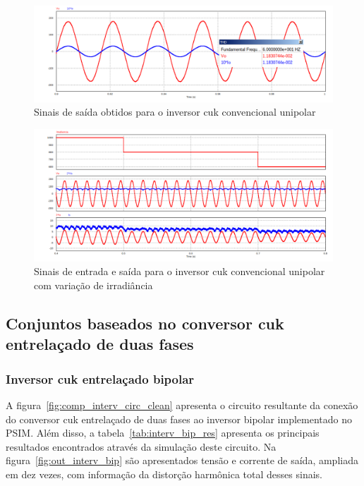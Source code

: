 \documentclass[
	12pt,				%
	openany,
	onseside,
	a4paper,			%
	english,			%
	french,				%
	spanish,			%
	brazil,				%
	]{abntex2}
\begin{document}
\begin{figure}[H]%
	\captionsetup{justification=centering}
	\centering
		\includegraphics[width= \linewidth]{conv_Vo_10Io_comp_unip}
		\caption{Sinais de saída obtidos para o inversor cuk convencional unipolar}
		\label{fig:out_conv_unip}
\end{figure}

\begin{figure}[H]%
	\captionsetup{justification=centering}
	\centering
		\includegraphics[width= \linewidth]{comp_conv_var_s_unip}
		\caption{Sinais de entrada e saída para o inversor cuk convencional unipolar com variação de irradiância}
		\label{fig:comp_conv_var_s_unip}
\end{figure}

\subsection{Conjuntos baseados no conversor cuk entrelaçado de duas fases}

\subsubsection{Inversor cuk entrelaçado bipolar}

A figura~\ref{fig:comp_interv_circ_clean} apresenta o circuito resultante da conexão do conversor cuk entrelaçado de duas fases ao inversor bipolar implementado no PSIM. Além disso, a tabela~\ref{tab:interv_bip_res} apresenta os principais resultados encontrados através da simulação deste circuito. Na figura~\ref{fig:out_interv_bip} são apresentados tensão e corrente de saída, ampliada em dez vezes, com informação da distorção harmônica total desses sinais.
\end{document}

